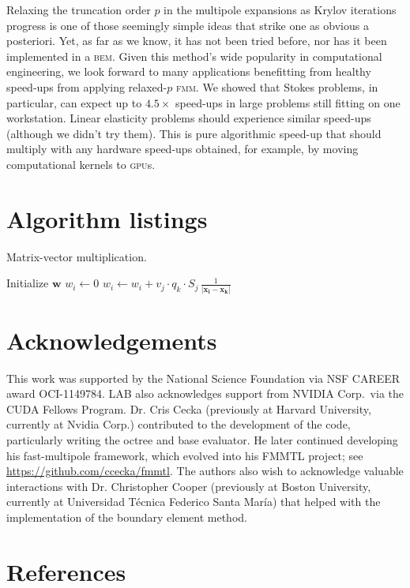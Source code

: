 \documentclass[final,3p,times]{elsarticle}
\newcommand{\gpu}{\textsc{gpu}}
\newcommand{\bem}{\textsc{bem}\xspace}
\newcommand{\fmm}{\textsc{fmm}\xspace}
\begin{document}
Relaxing the truncation order $p$ in the multipole expansions as Krylov iterations progress is one of those seemingly simple ideas that strike one as obvious a posteriori. Yet, as far as we know, it has not been tried before, nor has it been implemented in a \bem. Given this method's wide popularity in computational engineering, we look forward to many applications benefitting from healthy speed-ups from applying relaxed-$p$ \fmm. We  showed that Stokes problems, in particular, can expect up to $4.5\times$ speed-ups in large problems still fitting on one workstation. Linear elasticity problems should experience similar speed-ups (although we didn't try them). This is pure algorithmic speed-up that should multiply with any hardware speed-ups obtained, for example, by moving computational kernels to \gpu s.

\appendix
\section{Algorithm listings}\label{sec:algorithms}
 
 \begin{algorithm}
 \footnotesize
	\caption{Matrix-vector multiplication.}
	\label{alg:matvec}
	\begin{algorithmic}
		\State Initialize $\mathbf{w}$
			\State $w_i \gets 0$
				\State $w_i \gets w_i + v_j \cdot q_k \cdot S_j \, \frac{1}{|\mathbf{x_i}-\mathbf{x_k}|}$
				\EndFor
			\EndFor
		\EndFor 
	\end{algorithmic}
\end{algorithm}

\clearpage
\section*{Acknowledgements}
 This work was supported by the National Science Foundation via NSF CAREER award OCI-1149784. LAB also acknowledges support from NVIDIA Corp.\ via the CUDA Fellows Program. 
Dr. Cris Cecka (previously at Harvard University, currently at Nvidia Corp.) contributed to the development of the code, particularly writing the octree and base evaluator. He later continued developing his fast-multipole framework, which evolved into his FMMTL project; see \href{https://github.com/ccecka/fmmtl}{https://github.com/ccecka/fmmtl}.
The authors also wish to acknowledge valuable interactions with Dr. Christopher Cooper (previously at Boston University, currently at Universidad T{\'e}cnica Federico Santa Mar{\'i}a) that helped with the implementation of the boundary element method.


\section*{References}


\end{document}
